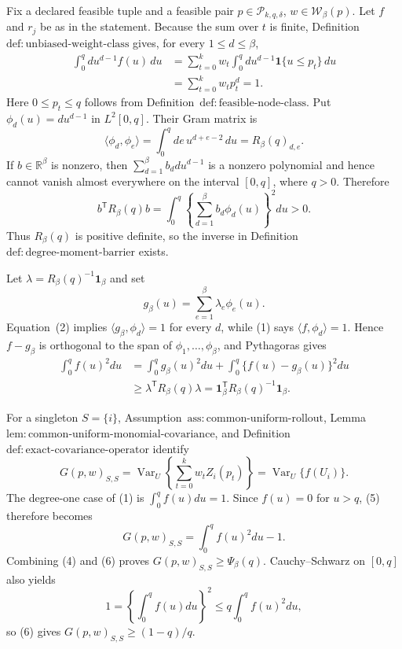 Fix a declared feasible tuple and a feasible pair \(p\in\mathcal P_{k,q,\delta}\), \(w\in\mathcal W_\beta(p)\).  Let \(f\) and \(r_j\) be as in the statement.  Because the sum over \(t\) is finite, Definition~\(\mathrm{def{:}unbiased\text{-}weight\text{-}class}\) gives, for every \(1\le d\le\beta\),
\[
\begin{aligned}
\int_0^q d u^{d-1}f(u)\,du
&=\sum_{t=0}^k w_t\int_0^q d u^{d-1}\mathbf 1\{u\le p_t\}\,du\\
&=\sum_{t=0}^k w_t p_t^d=1.
\end{aligned}
\tag{1}
\]
Here \(0\le p_t\le q\) follows from Definition~\(\mathrm{def{:}feasible\text{-}node\text{-}class}\).  Put \(\phi_d(u)=d u^{d-1}\) in \(L^2[0,q]\).  Their Gram matrix is
\[
\langle\phi_d,\phi_e\rangle
=\int_0^q de\,u^{d+e-2}\,du
=R_\beta(q)_{d,e}.
\tag{2}
\]
If \(b\in\mathbb R^\beta\) is nonzero, then \(\sum_{d=1}^\beta b_d d u^{d-1}\) is a nonzero polynomial and hence cannot vanish almost everywhere on the interval \([0,q]\), where \(q>0\).  Therefore
\[
b^{\mathsf T}R_\beta(q)b
=\int_0^q\left\{\sum_{d=1}^\beta b_d\phi_d(u)\right\}^2du>0.
\tag{3}
\]
Thus \(R_\beta(q)\) is positive definite, so the inverse in Definition~\(\mathrm{def{:}degree\text{-}moment\text{-}barrier}\) exists.

Let \(\lambda=R_\beta(q)^{-1}\mathbf 1_\beta\) and set
\[
g_\beta(u)=\sum_{e=1}^\beta\lambda_e\phi_e(u).
\]
Equation~(2) implies \(\langle g_\beta,\phi_d\rangle=1\) for every \(d\), while (1) says \(\langle f,\phi_d\rangle=1\).  Hence \(f-g_\beta\) is orthogonal to the span of \(\phi_1,\ldots,\phi_\beta\), and Pythagoras gives
\[
\begin{aligned}
\int_0^q f(u)^2du
&=\int_0^q g_\beta(u)^2du
+\int_0^q\{f(u)-g_\beta(u)\}^2du\\
&\ge \lambda^{\mathsf T}R_\beta(q)\lambda
=\mathbf 1_\beta^{\mathsf T}R_\beta(q)^{-1}\mathbf 1_\beta.
\end{aligned}
\tag{4}
\]

For a singleton \(S=\{i\}\), Assumption~\(\mathrm{ass{:}common\text{-}uniform\text{-}rollout}\), Lemma~\(\mathrm{lem{:}common\text{-}uniform\text{-}monomial\text{-}covariance}\), and Definition~\(\mathrm{def{:}exact\text{-}covariance\text{-}operator}\) identify
\[
G(p,w)_{S,S}
=\operatorname{Var}_U\!\left\{\sum_{t=0}^k w_tZ_i(p_t)\right\}
=\operatorname{Var}_U\{f(U_i)\}.
\tag{5}
\]
The degree-one case of (1) is \(\int_0^qf(u)du=1\).  Since \(f(u)=0\) for \(u>q\), (5) therefore becomes
\[
G(p,w)_{S,S}=\int_0^q f(u)^2du-1.
\tag{6}
\]
Combining (4) and (6) proves \(G(p,w)_{S,S}\ge\Psi_\beta(q)\).  Cauchy--Schwarz on \([0,q]\) also yields
\[
1=\left\{\int_0^qf(u)du\right\}^2
\le q\int_0^qf(u)^2du,
\tag{7}
\]
so (6) gives \(G(p,w)_{S,S}\ge(1-q)/q\).

